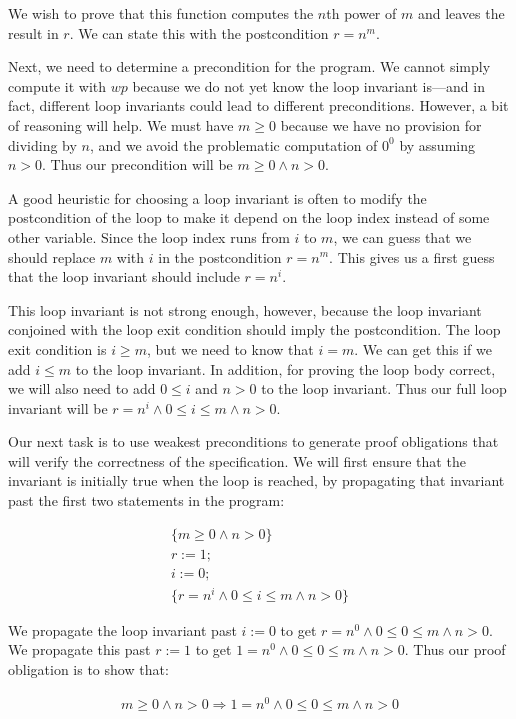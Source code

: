 \documentclass[11pt]{article}
\begin{document}
We wish to prove that this function computes the $n$th power of $m$
and leaves the result in $r$.  We can state this with the
postcondition $r=n^m$.

Next, we need to determine a precondition for the program.  We cannot simply
compute it with $wp$ because we do not yet know the loop
invariant is---and in fact, different loop invariants could lead to
different preconditions.  However, a bit of reasoning will help.  We
must have $m \ge 0$ because we have no provision for dividing by $n$,
and we avoid the problematic computation of $0^0$ by assuming $n>0$.
Thus our precondition will be $m \ge 0 \land n > 0$.

A good heuristic for choosing a
loop invariant is often to modify the postcondition of the loop to
make it depend on the loop index instead of some other variable.
Since the loop index runs from $i$ to $m$, we can guess that we should
replace $m$ with $i$ in the postcondition $r=n^m$.  This gives us a
first guess that the loop invariant should include $r=n^i$.

This loop invariant is not strong enough, however, because the loop invariant conjoined with the
loop exit condition should imply the postcondition.  The loop exit
condition is $i \ge m$, but we need to know that $i = m$.  We can get
this if we add $i \le m$ to the loop invariant.  In addition, for
proving the loop body correct, we will also need to add $0 \le i$ and
$n > 0$ to the loop invariant.  Thus our full loop invariant
will be $r=n^i \land 0 \le i \le m \land n > 0$.

Our next task is to use weakest preconditions to generate proof
obligations that will verify the correctness of the specification.
We will first ensure that the invariant is initially true when
the loop is reached, by propagating that invariant past the first
two statements in the program:

\[
\begin{array}{l}
\{m \ge 0 \land n > 0\}\\
r := 1;\\
i := 0;\\
\{ r=n^i \land 0 \le i \le m \land n > 0 \}
\end{array}
\]

We propagate the loop invariant past $i :=0$ to get
$r=n^0 \land 0 \le 0 \le m \land n > 0$.  We propagate this
past $r :=1$ to get $1=n^0 \land 0 \le 0 \le m \land n > 0$.
Thus our proof obligation is to show that:

\[
\begin{array}{l}
m \ge 0 \land n > 0
\Rightarrow 1=n^0 \land 0 \le 0 \le m \land n > 0
\end{array}
\]
\end{document}
